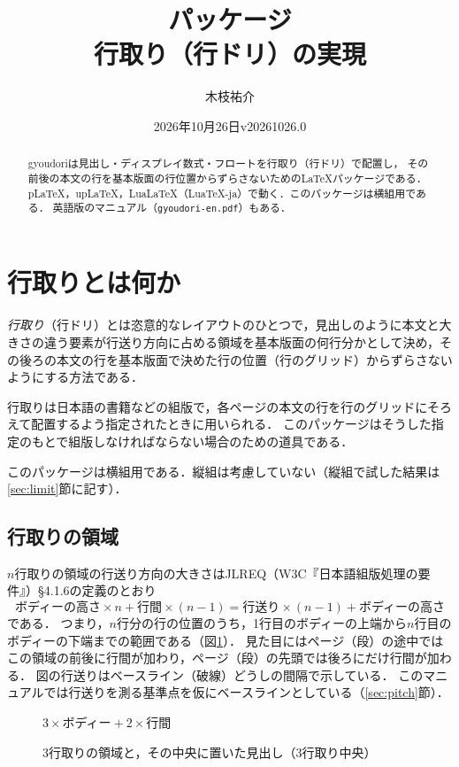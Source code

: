 \documentclass[paper=a4,dvipdfmx]{jlreq}
\title{\pkg{gyoudori}パッケージ\\[.5ex]\large 行取り（行ドリ）の実現}
\author{木枝祐介}
\date{2026年10月26日\quad v20261026.0}
\newcommand\pkg[1]{\textsf{#1}}
\begin{document}
\maketitle

\begin{abstract}
\pkg{gyoudori}は見出し・ディスプレイ数式・フロートを行取り（行ドリ）で配置し，
その前後の本文の行を基本版面の行位置からずらさないための\LaTeX{}パッケージである．
pLaTeX，upLaTeX，LuaLaTeX（LuaTeX-ja）で動く．このパッケージは横組用である．
英語版のマニュアル（\texttt{gyoudori-en.pdf}）もある．
\end{abstract}

\section{行取りとは何か}

\emph{行取り}（行ドリ）とは恣意的なレイアウトのひとつで，見出しのように本文と大きさの違う要素が行送り方向に占める領域を基本版面の何行分かとして決め，その後ろの本文の行を基本版面で決めた行の位置（行のグリッド）からずらさないようにする方法である．

行取りは日本語の書籍などの組版で，各ページの本文の行を行のグリッドにそろえて配置するよう指定されたときに用いられる．
このパッケージはそうした指定のもとで組版しなければならない場合のための道具である．

このパッケージは横組用である．縦組は考慮していない（縦組で試した結果は\ref{sec:limit}\nobreak 節に記す）．

\subsection{行取りの領域}

$n$行取りの領域の行送り方向の大きさはJLREQ（W3C『日本語組版処理の要件』）\S4.1.6の定義のとおり
\[
  \text{ボディーの高さ}\times n + \text{行間}\times(n-1)
  = \text{行送り}\times(n-1) + \text{ボディーの高さ}
\]
である．
つまり，$n$行分の行の位置のうち，1行目のボディーの上端から$n$行目のボディーの下端までの範囲である（図\nobreak\ref{fig:area}）．
見た目にはページ（段）の途中ではこの領域の前後に行間が加わり，ページ（段）の先頭では後ろにだけ行間が加わる．
図の行送りはベースライン（破線）どうしの間隔で示している．
このマニュアルでは行送りを測る基準点を仮にベースラインとしている（\ref{sec:pitch}\nobreak 節）．

\begin{figure}[htbp]
  \centering
    {$3\times\text{ボディー}+2\times\text{行間}$}
  \caption{3行取りの領域と，その中央に置いた見出し（3行取り中央）}
  \label{fig:area}
\end{figure}
\end{document}
